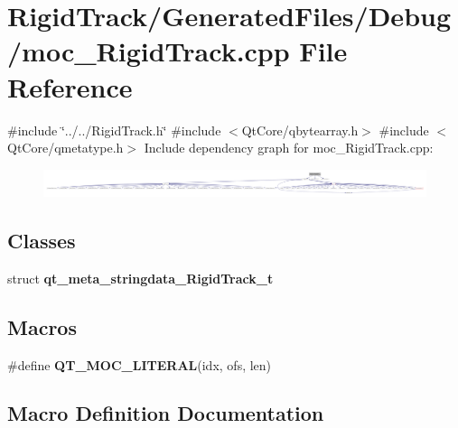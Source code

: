 \section{Rigid\+Track/\+Generated\+Files/\+Debug/moc\+\_\+\+Rigid\+Track.cpp File Reference}
\label{_debug_2moc___rigid_track_8cpp}
{\ttfamily \#include \char`\"{}../../\+Rigid\+Track.\+h\char`\"{}}\newline
{\ttfamily \#include $<$Qt\+Core/qbytearray.\+h$>$}\newline
{\ttfamily \#include $<$Qt\+Core/qmetatype.\+h$>$}\newline
Include dependency graph for moc\+\_\+\+Rigid\+Track.\+cpp\+:\nopagebreak
\begin{figure}[H]
\begin{center}
\leavevmode
\includegraphics[width=350pt]{_debug_2moc___rigid_track_8cpp__incl}
\end{center}
\end{figure}
\subsection*{Classes}
\begin{DoxyCompactItemize}
\item 
struct \textbf{ qt\+\_\+meta\+\_\+stringdata\+\_\+\+Rigid\+Track\+\_\+t}
\end{DoxyCompactItemize}
\subsection*{Macros}
\begin{DoxyCompactItemize}
\item 
\#define \textbf{ Q\+T\+\_\+\+M\+O\+C\+\_\+\+L\+I\+T\+E\+R\+AL}(idx,  ofs,  len)
\end{DoxyCompactItemize}


\subsection{Macro Definition Documentation}
\mbox{\label{_debug_2moc___rigid_track_8cpp_a75bb9482d242cde0a06c9dbdc6b83abe}} 
